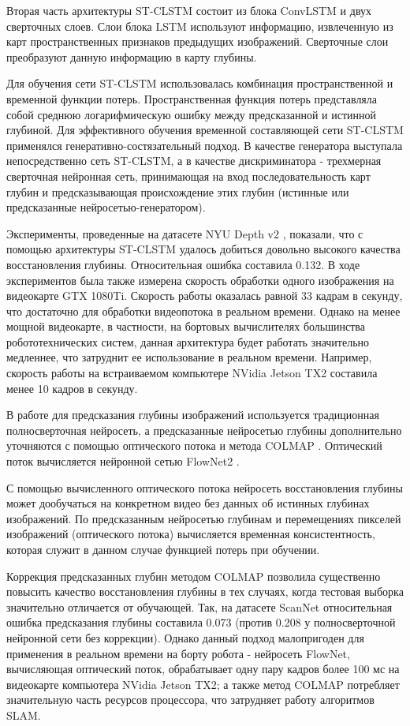 \documentclass{mipt-thesis-ms}
\begin{document}
	Вторая часть архитектуры ST-CLSTM состоит из блока ConvLSTM и двух сверточных слоев. Слои блока LSTM используют информацию, извлеченную из карт пространственных признаков предыдущих изображений. Сверточные слои преобразуют данную информацию в карту глубины.
	
	Для обучения сети ST-CLSTM использовалась комбинация пространственной и временной функции потерь. Пространственная функция потерь представляла собой среднюю логарифмическую ошибку между предсказанной и истинной глубиной. Для эффективного обучения временной составляющей сети ST-CLSTM применялся генеративно-состязательный подход. В качестве генератора выступала непосредственно сеть ST-CLSTM, а в качестве дискриминатора - трехмерная сверточная нейронная сеть, принимающая на вход последовательность карт глубин и предсказывающая происхождение этих глубин (истинные или предсказанные нейросетью-генератором).
	
	Эксперименты, проведенные на датасете NYU Depth v2 \cite{silberman2012indoor}, показали, что с помощью архитектуры ST-CLSTM удалось добиться довольно высокого качества восстановления глубины. Относительная ошибка составила 0.132. В ходе экспериментов была также измерена скорость обработки одного изображения на видеокарте GTX 1080Ti. Скорость работы оказалась равной 33 кадрам в секунду, что достаточно для обработки видеопотока в реальном времени. Однако на менее мощной видеокарте, в частности, на бортовых вычислителях большинства робототехнических систем, данная архитектура будет работать значительно медленнее, что затруднит ее использование в реальном времени. Например, скорость работы на встраиваемом компьютере NVidia Jetson TX2 составила менее 10 кадров в секунду.
	
	В работе \cite{luo2020consistent} для предсказания глубины изображений используется традиционная полносверточная нейросеть, а предсказанные нейросетью глубины дополнительно уточняются с помощью оптического потока и метода COLMAP \cite{schonberger2016structure}. Оптический поток вычисляется нейронной сетью FlowNet2 \cite{ilg2017flownet}.
	
	С помощью вычисленного оптического потока нейросеть восстановления глубины может дообучаться на конкретном видео без данных об истинных глубинах изображений. По предсказанным нейросетью глубинам и перемещениях пикселей изображений (оптического потока) вычисляется временная консистентность, которая служит в данном случае функцией потерь при обучении.
	
	Коррекция предсказанных глубин методом COLMAP позволила существенно повысить качество восстановления глубины в тех случаях, когда тестовая выборка значительно отличается от обучающей. Так, на датасете ScanNet \cite{dai2017scannet} относительная ошибка предсказания глубины составила 0.073 (против 0.208 у полносверточной нейронной сети без коррекции). Однако данный подход малопригоден для применения в реальном времени на борту робота - нейросеть FlowNet, вычисляющая оптический поток, обрабатывает одну пару кадров более 100 мс на видеокарте компьютера NVidia Jetson TX2; а также метод COLMAP потребляет значительную часть ресурсов процессора, что затрудняет работу алгоритмов SLAM.
	
\end{document}
